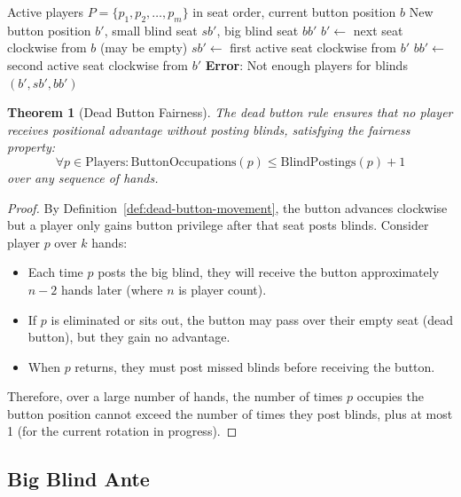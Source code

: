 \documentclass[11pt,a4paper]{article}
\newtheorem{theorem}{Theorem}[section]
\begin{document}
\begin{algorithm}
\caption{Dead Button Placement}
\label{alg:dead-button}
\begin{algorithmic}[1]
\Require Active players $P = \{p_1, p_2, \ldots, p_m\}$ in seat order, current button position $b$
\Ensure New button position $b'$, small blind seat $sb'$, big blind seat $bb'$
\State $b' \leftarrow$ next seat clockwise from $b$ (may be empty)
\State $sb' \leftarrow$ first active seat clockwise from $b'$
\State $bb' \leftarrow$ second active seat clockwise from $b'$
    \State \textbf{Error}: Not enough players for blinds
\EndIf
\State \Return $(b', sb', bb')$
\end{algorithmic}
\end{algorithm}

\begin{theorem}[Dead Button Fairness]
\label{thm:dead-button-fairness}
The dead button rule ensures that no player receives positional advantage without posting blinds, satisfying the fairness property:
\[
\forall p \in \text{Players}: \text{ButtonOccupations}(p) \leq \text{BlindPostings}(p) + 1
\]
over any sequence of hands.
\end{theorem}

\begin{proof}
By Definition~\ref{def:dead-button-movement}, the button advances clockwise but a player only gains button privilege after that seat posts blinds. Consider player $p$ over $k$ hands:
\begin{itemize}
    \item Each time $p$ posts the big blind, they will receive the button approximately $n-2$ hands later (where $n$ is player count).
    \item If $p$ is eliminated or sits out, the button may pass over their empty seat (dead button), but they gain no advantage.
    \item When $p$ returns, they must post missed blinds before receiving the button.
\end{itemize}
Therefore, over a large number of hands, the number of times $p$ occupies the button position cannot exceed the number of times they post blinds, plus at most 1 (for the current rotation in progress).
\end{proof}

\subsection{Big Blind Ante}
\end{document}
